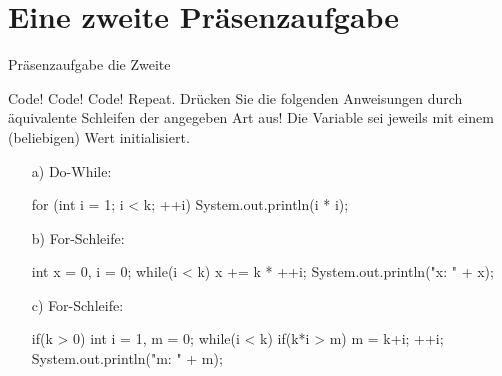 \section{Eine zweite Präsenzaufgabe}

\begin{frame}[fragile]{Präsenzaufgabe die Zweite}
    \setcounter{algocf}{0}
    \begin{aufgabe}{Code! Code! Code! Repeat.}
        \pause{}Drücken Sie die folgenden Anweisungen durch äquivalente Schleifen der angegeben Art aus!\pause{} Die Variable  sei jeweils mit einem (beliebigen) Wert initialisiert.\vspace*{-\smallskipamount}
        \begin{multicols}{2}
            \begin{enumerate}[<+(1)->]
                \item[a)] Do-While:
                \begin{plainjava}
for (int i = 1; i < k; ++i) {
    System.out.println(i * i);
}
                \end{plainjava}
                \item[b)] For-Schleife:
                \begin{plainjava}
int x = 0, i = 0;
while(i < k) { x += k * ++i; }
System.out.println("x: " + x);
                \end{plainjava}
                \item[c)] For-Schleife:
            \begin{plainjava}
if(k > 0){
    int i = 1, m = 0;
    while(i < k){
        if(k*i > m) m = k+i;
        ++i;
    }
    System.out.println("m: " + m);
}
\end{plainjava}
            \end{enumerate}
        \end{multicols}
    \end{aufgabe}
\end{frame}


